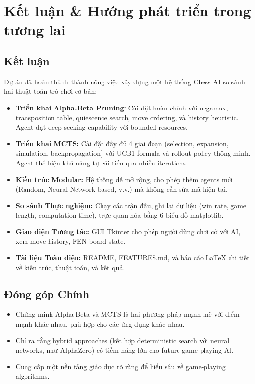 \section{Kết luận \& Hướng phát triển trong tương lai}

\subsection{Kết luận}
Dự án đã hoàn thành thành công việc xây dựng một hệ thống Chess AI so sánh hai thuật toán trò chơi cơ bản:

\begin{itemize}
    \item \textbf{Triển khai Alpha-Beta Pruning:} Cài đặt hoàn chỉnh với negamax, transposition table, quiescence search, move ordering, và history heuristic. Agent đạt deep-seeking capability với bounded resources.

    \item \textbf{Triển khai MCTS:} Cài đặt đầy đủ 4 giai đoạn (selection, expansion, simulation, backpropagation) với UCB1 formula và rollout policy thông minh. Agent thể hiện khả năng tự cải tiến qua nhiều iterations.

    \item \textbf{Kiến trúc Modular:} Hệ thống dễ mở rộng, cho phép thêm agents mới (Random, Neural Network-based, v.v.) mà không cần sửa mã hiện tại.

    \item \textbf{So sánh Thực nghiệm:} Chạy các trận đấu, ghi lại dữ liệu (win rate, game length, computation time), trực quan hóa bằng 6 biểu đồ matplotlib.

    \item \textbf{Giao diện Tương tác:} GUI Tkinter cho phép người dùng chơi cờ với AI, xem move history, FEN board state.

    \item \textbf{Tài liệu Toàn diện:} README, FEATURES.md, và báo cáo LaTeX chi tiết về kiến trúc, thuật toán, và kết quả.
\end{itemize}

\subsection{Đóng góp Chính}
\begin{itemize}
    \item Chứng minh Alpha-Beta và MCTS là hai phương pháp mạnh mẽ với điểm mạnh khác nhau, phù hợp cho các ứng dụng khác nhau.
    \item Chỉ ra rằng hybrid approaches (kết hợp deterministic search với neural networks, như AlphaZero) có tiềm năng lớn cho future game-playing AI.
    \item Cung cấp một nền tảng giáo dục rõ ràng để hiểu sâu về game-playing algorithms.
\end{itemize}

